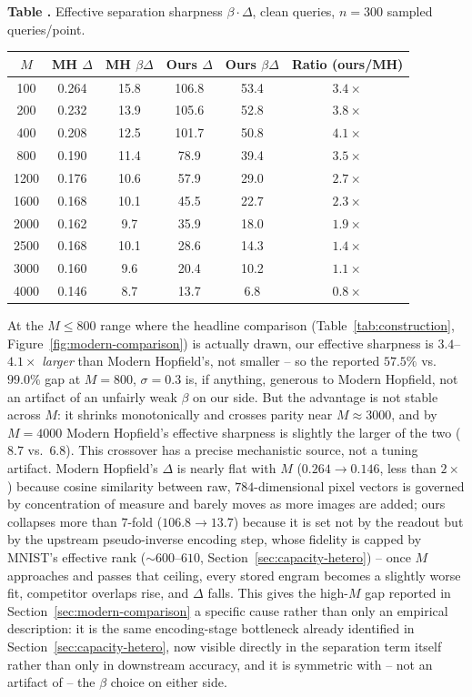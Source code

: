 \documentclass[11pt]{article}
\newcommand{\toprule}{\hline\hline}
\newcommand{\midrule}{\hline}
\newcommand{\bottomrule}{\hline\hline}
\begin{document}
\label{tab:beta-delta}
\noindent\textbf{Table \thetable.} Effective separation sharpness $\beta\cdot\Delta$, clean queries, $n{=}300$
sampled queries/point.
\begin{center}
\scriptsize
\begin{tabular}{cccccc}
\toprule
$M$ & MH $\Delta$ & MH $\beta\Delta$ & Ours $\Delta$ & Ours $\beta\Delta$ & Ratio (ours/MH) \\
\midrule
100  & 0.264 & 15.8 & 106.8 & 53.4 & $3.4\times$ \\
200  & 0.232 & 13.9 & 105.6 & 52.8 & $3.8\times$ \\
400  & 0.208 & 12.5 & 101.7 & 50.8 & $4.1\times$ \\
800  & 0.190 & 11.4 & 78.9  & 39.4 & $3.5\times$ \\
1200 & 0.176 & 10.6 & 57.9  & 29.0 & $2.7\times$ \\
1600 & 0.168 & 10.1 & 45.5  & 22.7 & $2.3\times$ \\
2000 & 0.162 & 9.7  & 35.9  & 18.0 & $1.9\times$ \\
2500 & 0.168 & 10.1 & 28.6  & 14.3 & $1.4\times$ \\
3000 & 0.160 & 9.6  & 20.4  & 10.2 & $1.1\times$ \\
4000 & 0.146 & 8.7  & 13.7  & 6.8  & $0.8\times$ \\
\bottomrule
\end{tabular}
\end{center}

At the $M{\leq}800$ range where the headline comparison
(Table~\ref{tab:construction}, Figure~\ref{fig:modern-comparison}) is actually drawn, our
effective sharpness is $3.4$--$4.1\times$ \emph{larger} than Modern Hopfield's, not smaller -- so
the reported $57.5\%$ vs.\ $99.0\%$ gap at $M{=}800$, $\sigma{=}0.3$ is, if anything, generous to
Modern Hopfield, not an artifact of an unfairly weak $\beta$ on our side. But the advantage is
not stable across $M$: it shrinks monotonically and crosses parity near $M{\approx}3000$, and by
$M{=}4000$ Modern Hopfield's effective sharpness is slightly the larger of the two ($8.7$ vs.\
$6.8$). This crossover has a precise mechanistic source, not a tuning artifact. Modern Hopfield's
$\Delta$ is nearly flat with $M$ ($0.264\to0.146$, less than $2\times$) because cosine similarity
between raw, $784$-dimensional pixel vectors is governed by concentration of measure and barely
moves as more images are added; ours collapses more than $7$-fold ($106.8\to13.7$) because it is
set not by the readout but by the upstream pseudo-inverse encoding step, whose fidelity is capped
by MNIST's effective rank (${\sim}600$--$610$, Section~\ref{sec:capacity-hetero}) -- once $M$
approaches and passes that ceiling, every stored engram becomes a slightly worse fit, competitor
overlaps rise, and $\Delta$ falls. This gives the high-$M$ gap reported in
Section~\ref{sec:modern-comparison} a specific cause rather than only an empirical description:
it is the same encoding-stage bottleneck already identified in Section~\ref{sec:capacity-hetero},
now visible directly in the separation term itself rather than only in downstream accuracy, and
it is symmetric with -- not an artifact of -- the $\beta$ choice on either side.
\end{document}
